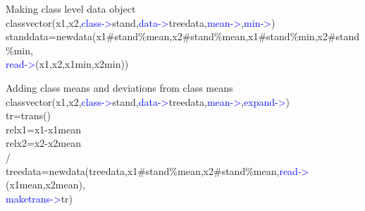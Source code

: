 \begin{example}[newclassdata]Making class level data object\\
\label{newclassdata}
\textcolor{VioletRed}{classvector}(x1,x2,\textcolor{blue}{class->}stand,\textcolor{blue}{data->}treedata,\textcolor{blue}{mean->},\textcolor{blue}{min->})\\
standdata=\textcolor{VioletRed}{newdata}(x1\#stand\%mean,x2\#stand\%mean,x1\#stand\%min,x2\#stand\%min,\\
\textcolor{blue}{read->}(x1,x2,x1min,x2min))
\end{example}
\begin{example}[addingclass]Adding class means and deviations from class means\\
\label{addingclass}
\textcolor{VioletRed}{classvector}(x1,x2,\textcolor{blue}{class->}stand,\textcolor{blue}{data->}treedata,\textcolor{blue}{mean->},\textcolor{blue}{expand->})\\
tr=\textcolor{VioletRed}{trans}()\\
relx1=x1-x1mean\\
relx2=x2-x2mean\\
/\\
treedata=\textcolor{VioletRed}{newdata}(treedata,x1\#stand\%mean,x2\#stand\%mean,\textcolor{blue}{read->}(x1mean,x2mean),\\
\textcolor{blue}{maketrans->}tr)
\end{example}

